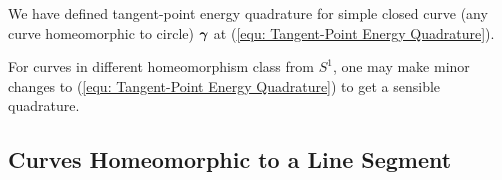 \documentclass[../dissertation.tex]{subfiles}
\begin{document}
We have defined tangent-point energy quadrature for simple closed curve (any curve homeomorphic to circle) $\boldsymbol{\gamma}$ at (\ref{equ: Tangent-Point Energy Quadrature}).

For curves in different homeomorphism class from $S^1$,
one may make minor changes to (\ref{equ: Tangent-Point Energy Quadrature}) to get a sensible quadrature.

\subsection{Curves Homeomorphic to a Line Segment}
\end{document}
